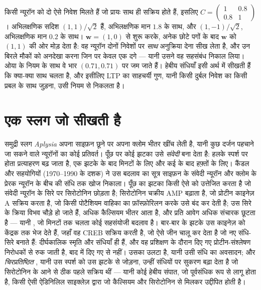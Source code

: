 \begin{example}[दो निवेश]\label{ex:b3:learning-memory:two-inputs}
किसी न्यूरॉन को दो ऐसे निवेश मिलते हैं जो प्रायः साथ ही सक्रिय होते
हैं, इसलिए $C =
\begin{pmatrix} 1 & 0.8 \\ 0.8 & 1\end{pmatrix}$। अभिलक्षणिक सदिश
$(1,1)/\sqrt{2}$ हैं, अभिलक्षणिक मान $1.8$ के साथ, और
$(1,-1)/\sqrt{2}$, अभिलक्षणिक मान $0.2$ के साथ। $\mathbf{w} = (1, 0)$ से शुरू
करके,  अनेक छोटे पगों के बाद $\mathbf{w}$ को $(1,1)$ की ओर
मोड़ देता है: वह न्यूरॉन दोनों निवेशों पर \emph{साथ} अनुक्रिया देना
सीख लेता है, और उन बिरले मौकों को अनदेखा करना जिन पर केवल एक दगे ---
यानी उसने वह सहसंबंध निकाल लिया। ओया के नियम के साथ वे भार
$(0.71, 0.71)$ पर जम जाते हैं। हेबीय संधियाँ इसी अर्थ में सीखती हैं कि
क्या-क्या साथ चलता है, और इसीलिए LTP का साहचर्यी गुण, यानी किसी दुर्बल
निवेश का किसी प्रबल के साथ जुड़ना, उसी नियम से निकलता है।
\end{example}

\section{एक स्लग जो सीखती है}

\begin{proposition}\label{prop:b3:learning-memory:aplysia}
समुद्री स्लग \emph{Aplysia} अपना साइफ़न छूने पर अपना क्लोम भीतर खींच
लेती है, यानी कुछ दर्जन पहचाने जा सकने वाले न्यूरॉनों का कोई प्रतिवर्त।
पूँछ पर कोई झटका उसे \emph{संवेदी} बना देता है: हलके स्पर्श पर होता
प्रत्याहरण बढ़ जाता है, एक झटके के बाद मिनटों के लिए और कई के बाद
हफ़्तों के लिए। कैंडल और सहयोगियों (1970--1990 के दशक) ने उस बदलाव का
सूत्र साइफ़न के संवेदी न्यूरॉन और क्लोम के प्रेरक न्यूरॉन के बीच की
संधि तक खोज निकाला। पूँछ का झटका किसी ऐसे  को उत्तेजित करता
है जो संवेदी न्यूरॉन के सिरे पर सिरोटोनिन छोड़ता है; सिरोटोनिन चक्रीय
AMP बढ़ाता है, जो प्रोटीन काइनेज़ A सक्रिय करता है, जो किसी पोटैशियम
वाहिका का फ़ॉस्फ़ोरिलन करके उसे बंद कर देती है; उस सिरे के क्रिया विभव
चौड़े हो जाते हैं, अधिक कैल्सियम भीतर आता है, और प्रति आवेग अधिक
संचारक छूटता है --- यानी \emph{}, जो मिनटों तक चलता कोई
सहसंयोजी बदलाव है। बार-बार के झटके उस काइनेज़ को केंद्रक तक भेज देते
हैं, जहाँ वह CREB सक्रिय करती है, जो ऐसे जीन चालू कर देता है जो नए
संधि-सिरे बनाते हैं: दीर्घकालिक स्मृति और संधियाँ ही हैं, और वह
प्रशिक्षण के दौरान दिए गए प्रोटीन-संश्लेषण निरोधकों से रुक जाती है, बाद
में दिए गए से नहीं। \emph{} उसका उलटा है, यानी उसी संधि का
अवसादन; और \emph{चिरप्रतिष्ठित }, यानी उस स्पर्श को उस झटके से
जोड़ना, उन्हीं संधियों पर सुकरण बढ़ा देता है जो सिरोटोनिन के आने से ठीक
पहले सक्रिय थीं --- यानी कोई हेबीय संपात, जो पूर्वसंधिक रूप से लागू
होता है, किसी ऐसी ऐडिनिलिल साइक्लेज़ द्वारा जो कैल्सियम और सिरोटोनिन से
मिलकर उद्दीपित होती है।
\end{proposition}

